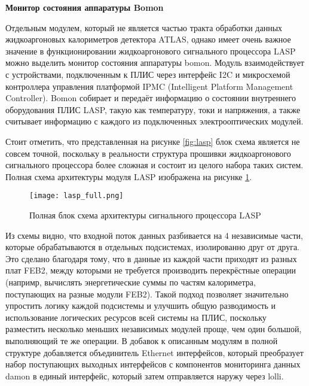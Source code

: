 \textbf{Монитор состояния аппаратуры Bomon}\par
Отдельным модулем, который не является частью тракта обработки данных жидкоаргоновых калориметров детектора ATLAS, однако имеет очень важное значение в функционировании жидкоаргонового сигнального процессора LASP можно выделить монитор состояния аппаратуры bomon. Модуль взаимодействует с устройствами, подключенным к ПЛИС через интерфейс I2C и микросхемой контроллера управления платформой IPMC (Intelligent Platform Management Controller). Bomon собирает и передаёт информацию о состоянии внутреннего оборудования ПЛИС LASP, такую как температуру, токи и напряжения, а также считывает информацию с каждого из подключенных электрооптических модулей.\par
Стоит отметить, что представленная на рисунке \ref{fig:lasp} блок схема является не совсем точной, поскольку в реальности структура прошивки жидкоаргонового сигнального процессора более сложная и состоит из целого набора таких систем. Полная схема архитектуры модуля LASP изображена на рисунке \ref{fig:lasp_full}.\par

\begin{figure}[ht]
    \centering
    \texttt{[image: lasp\_full.png]}
    \caption{Полная блок схема архитектуры сигнального процессора LASP}
    \label{fig:lasp_full}
\end{figure}\par

Из схемы видно, что входной поток данных разбивается на 4 независимые части, которые обрабатываются в отдельных подсистемах, изолированно друг от друга. Это сделано благодаря тому, что в данные из каждой части приходят из разных плат FEB2, между которыми не требуется производить перекрёстные операции (напримр, вычислять энергетические суммы по частям калориметра, поступающих на разные модули FEB2). Такой подход позволяет значительно упростить логику каждой подсистемы и улучшить общую разводимость и использование логических ресурсов всей системы на ПЛИС, поскольку разместить несколько меньших независимых модулей проще, чем один большой, выполняющий те же операции. В добавок к описанным модулям в полной структуре добавляется объединитель Ethernet интерфейсов, который преобразует набор поступающих выходных интерфейсов с компонентов мониторинга данных damon в единый интерфейс, который затем отправляется наружу через lolli.\par
